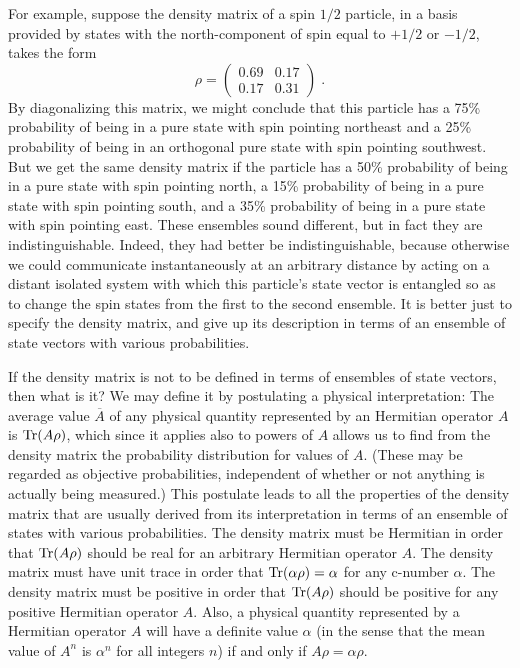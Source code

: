 \documentclass[12pt]{article}
\begin{document}
For example, suppose the density matrix of a spin $1/2$ particle, in a basis provided by states with the north-component of spin equal to $+1/2$ or $-1/2$, takes the form
$$ \rho=\left(\begin{array}{cc} 0.69 & 0.17 \\ 0.17 & 0.31\end{array}\right)\;.$$
By diagonalizing this matrix, we might conclude that 
 this particle has a 75\% probability of being in a pure state with spin pointing northeast and a 25\% probability of being in an orthogonal pure state with spin pointing southwest.  But we get the same density matrix if the particle has a 50\% probability of being in a pure state with spin pointing north, a 15\% probability of being in a pure state with spin pointing south, and a 35\% probability of being in a pure state with spin pointing east.    These ensembles sound different, but in fact they are indistinguishable.  Indeed, they had better be indistinguishable, because otherwise we could communicate instantaneously at an arbitrary distance by acting on a distant isolated system with which this particle's state vector is entangled so as to change the  spin states from the first to the second ensemble.  It is better just to specify the density matrix,
and give up its description in terms of an ensemble of state vectors with various probabilities.



If the density matrix is not to be defined in terms of ensembles of state vectors, then what is it?  We may define it by  postulating a physical interpretation:   The average value $\overline{A}$ of any physical quantity represented by an Hermitian operator $A$ is ${\rm Tr}(A\rho)$, which since it applies also to powers of $A$ allows us to find from the density matrix the probability distribution  for values of $A$.  (These may be regarded as objective probabilities, independent of whether or not anything is actually being measured.)  This postulate leads to all the  properties of the density matrix that are usually derived from its interpretation in terms of an ensemble of states with various probabilities.  The density matrix must be Hermitian in order that ${\rm Tr}(A\rho)$ should be real for an arbitrary Hermitian operator $A$.  The density matrix must have unit trace in order that ${\rm Tr}(\alpha\rho)=\alpha$ for any c-number $\alpha$.  The density matrix must be positive in order that ${\rm Tr}(A\rho)$ should be positive for any positive Hermitian operator $A$.  Also, a physical quantity represented by a Hermitian operator $A$ will have a definite value $\alpha$ (in the sense that the mean value of $A^n$ is $\alpha^n$ for all integers $n$) if and only if $A\rho=\alpha\rho$.  
\end{document}
